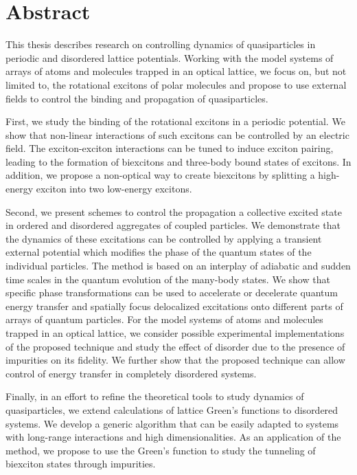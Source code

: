 
\chapter{Abstract}

This thesis describes research on controlling dynamics of quasiparticles in 
 periodic and disordered lattice potentials. Working with the model systems of arrays of atoms and molecules trapped in an optical lattice, 
we focus on, but not limited to, the rotational excitons of polar molecules and propose to use external fields to 
control the binding and propagation of quasiparticles. 

First, we study the binding of the rotational excitons in a periodic potential. We show that non-linear interactions of such excitons can
 be controlled by an electric field. The exciton-exciton interactions can be tuned
 to induce exciton pairing, leading to the formation of biexcitons and three-body bound states of excitons. In addition, we propose a non-optical way to create biexcitons by splitting a high-energy exciton into two 
low-energy excitons. 

Second, we present schemes to control the propagation a collective
 excited state in ordered and disordered aggregates of coupled particles. We demonstrate that the dynamics of these excitations can be controlled by
 applying a transient external potential which modifies the phase of the quantum
 states of the individual particles. The method is based on an interplay of adiabatic
 and sudden time scales in the quantum evolution of the many-body states. We show
 that specific phase transformations can be used to accelerate or decelerate quantum
 energy transfer and spatially focus delocalized excitations onto different parts of
arrays of quantum particles. For the model systems of atoms and molecules trapped in an optical lattice, we consider possible experimental implementations
 of the proposed technique and study the effect of disorder due to the presence of
 impurities on its fidelity. We further show that the proposed technique can allow
 control of energy transfer in completely disordered systems.
 

Finally, in an effort to refine the theoretical tools to study dynamics of quasiparticles, we extend calculations of lattice 
Green's functions to disordered systems. We develop a generic algorithm that can 
be easily adapted to systems with long-range interactions and high dimensionalities. As an application of the method, we propose 
to use the Green’s function to study the tunneling of biexciton states through
 impurities.


